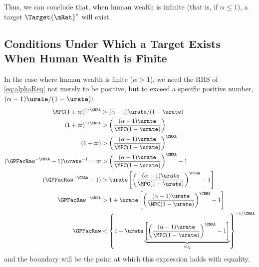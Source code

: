 \documentclass{handout}
\begin{document}
Thus, we can conclude that, when human wealth is infinite (that is, if $\alpha \leq 1$), a target $\Target{\mRat}^{e}$ will exist.  

\subsection{Conditions Under Which a Target Exists When Human Wealth is Finite}

In the case where human wealth is finite ($\alpha > 1$), we need the RHS of \eqref{eq:alphaReq} not merely to be positive, but to exceed a specific positive number, $(\alpha-1)\urate/(1-\urate)$:  
\begin{equation}\begin{gathered}\begin{aligned}
    \MPCU (1+\varpi)^{1/\CRRA} & >  (\alpha-1)\urate/(1-\urate)
\\   (1+\varpi)^{1/\CRRA} & >  \left(\frac{(\alpha-1)\urate}{\MPCU (1-\urate)}\right)
\\   (1+\varpi) & >  \left(\frac{(\alpha-1)\urate}{\MPCU (1-\urate)}\right)^{\CRRA}
\\  (\GPFacRaw^{-\CRRA}-1)\urate^{-1} = \varpi & >  \left(\frac{(\alpha-1)\urate}{\MPCU (1-\urate)}\right)^{\CRRA}-1
\\  (\GPFacRaw^{-\CRRA}-1) & >  \urate \left[\left(\frac{(\alpha-1)\urate}{\MPCU (1-\urate)}\right)^{\CRRA}-1\right]
\\  \GPFacRaw^{-\CRRA} & >  1  + \urate \left[\left(\frac{(\alpha-1)\urate}{\MPCU (1-\urate)}\right)^{\CRRA}-1\right]
\\  \GPFacRaw & <  \left\{1  + \urate \underbrace{\left[\left(\frac{(\alpha-1)\urate}{\MPCU (1-\urate)}\right)^{\CRRA}-1\right]}_{\equiv \chi} \right\}^{-1/\CRRA} \label{eq:GPFacRawReqForTarget}
\end{aligned}\end{gathered}\end{equation}
and the boundary will be the point at which this expression holds with equality.  
\end{document}
